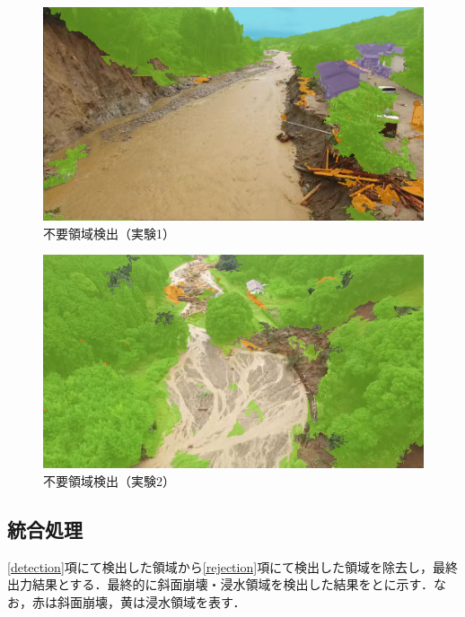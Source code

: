 \documentclass[../Thesis]{subfiles}
\begin{document}
\begin{figure}[tbp]
	\centering
	\includegraphics[width=12cm]{img/rejection1.png}
	\caption{不要領域検出（実験1）}
	\label{img14}
\end{figure}
\begin{figure}[tbp]
	\centering
	\includegraphics[width=12cm]{img/rejection2.png}
	\caption{不要領域検出（実験2）}
	\label{img15}
\end{figure}

\subsection{統合処理}
	\ref{detection}項にて検出した領域から\ref{rejection}項にて検出した領域を除去し，最終出力結果とする．最終的に斜面崩壊・浸水領域を検出した結果をとに示す．なお，赤は斜面崩壊，黄は浸水領域を表す．
\end{document}
